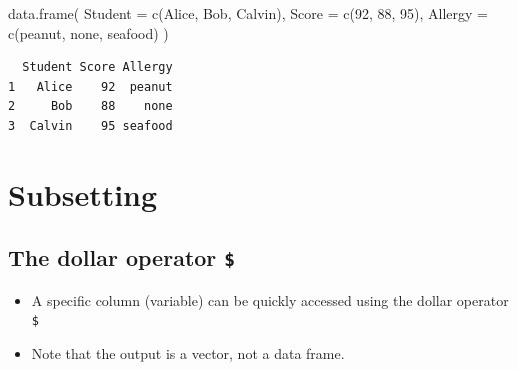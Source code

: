 \documentclass[
  letterpaper,
  DIV=11,
  numbers=noendperiod]{scrreprt}
\newenvironment{Shaded}{\begin{snugshade}}{\end{snugshade}}
\newcommand{\AttributeTok}[1]{\textcolor[rgb]{0.40,0.45,0.13}{#1}}
\newcommand{\DecValTok}[1]{\textcolor[rgb]{0.68,0.00,0.00}{#1}}
\newcommand{\FunctionTok}[1]{\textcolor[rgb]{0.28,0.35,0.67}{#1}}
\newcommand{\NormalTok}[1]{\textcolor[rgb]{0.00,0.23,0.31}{#1}}
\newcommand{\StringTok}[1]{\textcolor[rgb]{0.13,0.47,0.30}{#1}}
\begin{document}
\begin{tcolorbox}[enhanced jigsaw, colbacktitle=quarto-callout-tip-color!10!white, opacitybacktitle=0.6, breakable, left=2mm, leftrule=.75mm, toprule=.15mm, toptitle=1mm, bottomtitle=1mm, colframe=quarto-callout-tip-color-frame, opacityback=0, coltitle=black, arc=.35mm, titlerule=0mm, colback=white, bottomrule=.15mm, title=\textcolor{quarto-callout-tip-color}{\faLightbulb}\hspace{0.5em}{Answer}, rightrule=.15mm]

\begin{Shaded}
\begin{Highlighting}[]
\FunctionTok{data.frame}\NormalTok{(}
  \AttributeTok{Student =} \FunctionTok{c}\NormalTok{(}\StringTok{\textquotesingle{}Alice\textquotesingle{}}\NormalTok{, }\StringTok{\textquotesingle{}Bob\textquotesingle{}}\NormalTok{, }\StringTok{\textquotesingle{}Calvin\textquotesingle{}}\NormalTok{), }
  \AttributeTok{Score   =} \FunctionTok{c}\NormalTok{(}\DecValTok{92}\NormalTok{, }\DecValTok{88}\NormalTok{, }\DecValTok{95}\NormalTok{), }
  \AttributeTok{Allergy =} \FunctionTok{c}\NormalTok{(}\StringTok{\textquotesingle{}peanut\textquotesingle{}}\NormalTok{, }\StringTok{\textquotesingle{}none\textquotesingle{}}\NormalTok{, }\StringTok{\textquotesingle{}seafood\textquotesingle{}}\NormalTok{)}
\NormalTok{)}
\end{Highlighting}
\end{Shaded}

\begin{verbatim}
  Student Score Allergy
1   Alice    92  peanut
2     Bob    88    none
3  Calvin    95 seafood
\end{verbatim}

\end{tcolorbox}

\section{Subsetting}\label{subsetting-1}

\subsection{\texorpdfstring{The dollar operator
\texttt{\$}}{The dollar operator \$}}\label{the-dollar-operator}

\begin{itemize}
\item
  A specific column (variable) can be quickly accessed using the dollar
  operator \texttt{\$}
\item
  Note that the output is a vector, not a data frame.
\end{itemize}
\end{document}
